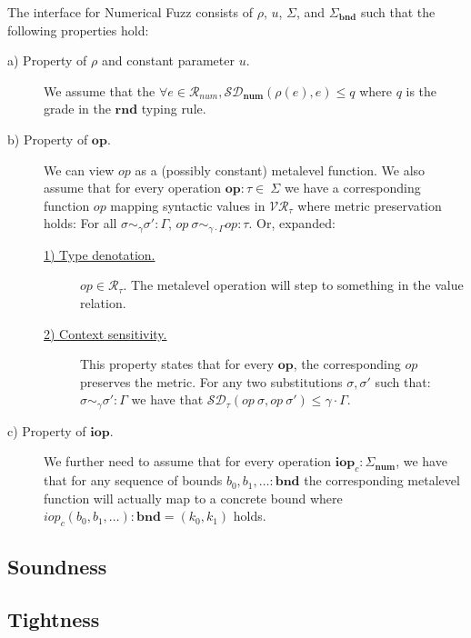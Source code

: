 \begin{definition}
  \label{def:numfuzz-interface}
  The interface for Numerical Fuzz consists of $\rho$, $u$, $\Sigma$, and
  $\Sigma_{\mathbf{bnd}}$ such that the following properties hold: 
\begin{description}
  \item[a) Property of $\rho$ and constant parameter $u$.] We assume that the
    $\forall e \in \mathcal{R}_{num}, \mathcal{SD}_{\mathbf{num}}(\rho(e), e)
    \leq q$ where $q$ is the grade in the $\mathbf{rnd}$ typing rule.
  \item[b) Property of $\mathbf{op}$.] 
    We can view $\textit{op}$ as a (possibly constant) metalevel function.
    We also assume that for every operation
    $\mathbf{op} : \tau \in \ \Sigma$ we have a
    corresponding function $op$ mapping syntactic values in
    $\mathcal{VR}_{\tau}$ where metric preservation holds: For all $\sigma
    \sim_{\gamma} \sigma' : \Gamma$, $\textit{op}~\sigma \sim_{\gamma \cdot
    \Gamma} \textit{op} : \tau$.
    Or, expanded:
    \begin{description}
      \item[\underline{1) Type denotation.}] $\mathit{op} \in
        \mathcal{R}_{\tau}$. The metalevel operation will step to something in the
        value relation.
      \item[\underline{2) Context sensitivity.}]
        This property states that for every $\textbf{op}$, the
        corresponding $\textit{op}$ preserves the metric. For any two
        substitutions $\sigma, \sigma'$ such that:
        $\sigma \sim_{\gamma} \sigma' : \Gamma$
        we have that
        $\mathcal{SD}_{\tau}(\textit{op}~\sigma, \textit{op}~\sigma') \leq \gamma \cdot \Gamma$.
    \end{description} \item[c) Property of $\mathbf{iop}$.] We further need to
      assume that for every operation $\mathbf{iop}_c : \Sigma_\textbf{num}$, we
      have that for any sequence of bounds $b_0, b_1, \ldots : \textbf{bnd}$ the
      corresponding metalevel function will actually map to a concrete bound
      where $\textit{iop}_c(b_0, b_1, \ldots) : \textbf{bnd} = (k_0, k_1)$
      holds.
\end{description}
\end{definition}

\subsection{Soundness}


\subsection{Tightness} \label{sec:tightness}



